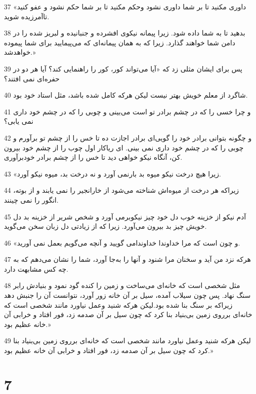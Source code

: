 \par 37 «داوری مکنید تا بر شما داوری نشود وحکم مکنید تا بر شما حکم نشود و عفو کنید تاآمرزیده شوید.
\par 38 بدهید تا به شما داده شود. زیرا پیمانه نیکوی افشرده و جنبانیده و لبریز شده را در دامن شما خواهند گذارد. زیرا که به همان پیمانه‌ای که می‌پیمایید برای شما پیموده خواهدشد.»
\par 39 پس برای ایشان مثلی زد که «آیا می‌تواند کور، کور را راهنمایی کند؟ آیا هر دو در حفره‌ای نمی افتند؟
\par 40 شاگرد از معلم خویش بهتر نیست لیکن هر‌که کامل شده باشد، مثل استاد خود بود.
\par 41 و چرا خسی را که در چشم برادر تو است می‌بینی و چوبی را که در چشم خود داری نمی یابی؟
\par 42 و چگونه بتوانی برادر خود را گویی‌ای برادر اجازت ده تا خس را از چشم تو برآورم و چوبی را که در چشم خود داری نمی بینی. ای ریاکار اول چوب را از چشم خود بیرون کن، آنگاه نیکو خواهی دید تا خس را از چشم برادر خودبرآوری.
\par 43 «زیرا هیچ درخت نیکو میوه بد بارنمی آورد و نه درخت بد، میوه نیکو آورد.
\par 44 زیراکه هر درخت از میوه‌اش شناخته می‌شود از خارانجیر را نمی یابند و از بوته، انگور را نمی چینند.
\par 45 آدم نیکو از خزینه خوب دل خود چیز نیکوبرمی آورد و شخص شریر از خزینه بد دل خویش چیز بد بیرون می‌آورد. زیرا که از زیادتی دل زبان سخن می‌گوید.
\par 46 «و چون است که مرا خداوندا خداوندامی گویید و آنچه می‌گویم بعمل نمی آورید.
\par 47 هر‌که نزد من آید و سخنان مرا شنود و آنها را به‌جا آورد، شما را نشان می‌دهم که به چه کس مشابهت دارد.
\par 48 مثل شخصی است که خانه‌ای می‌ساخت و زمین را کنده گود نمود و بنیادش رابر سنگ نهاد. پس چون سیلاب آمده، سیل بر آن خانه زور آورد، نتوانست آن را جنبش دهد زیراکه بر سنگ بنا شده بود.لیکن هر‌که شنید وعمل نیاورد مانند شخصی است که خانه‌ای برروی زمین بی‌بنیاد بنا کرد که چون سیل بر آن صدمه زد، فور افتاد و خرابی آن خانه عظیم بود.»
\par 49 لیکن هر‌که شنید وعمل نیاورد مانند شخصی است که خانه‌ای برروی زمین بی‌بنیاد بنا کرد که چون سیل بر آن صدمه زد، فور افتاد و خرابی آن خانه عظیم بود.»

\chapter{7}

